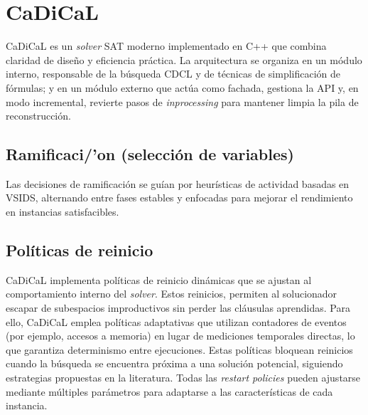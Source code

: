 \section{CaDiCaL}
\label{sec:cadical}

CaDiCaL es un \textit{solver} SAT moderno implementado en C++ que combina claridad de diseño y eficiencia práctica. La arquitectura se organiza en un módulo interno, responsable de la búsqueda CDCL y de técnicas de simplificación de fórmulas; y en un módulo externo que actúa como fachada, gestiona la API y, en modo incremental, revierte pasos de \textit{inprocessing} para mantener limpia la pila de reconstrucción.

\subsection{Ramificaci/'on (selecci\'on de variables)}
Las decisiones de ramificación se guían por heurísticas de actividad basadas en VSIDS, alternando entre fases estables y enfocadas para mejorar el rendimiento en instancias satisfacibles. %

\subsection{Políticas de reinicio}
\label{subsec:cadical-restart}

CaDiCaL implementa políticas de reinicio dinámicas que se ajustan al comportamiento interno del \textit{solver}. %
Estos reinicios, permiten al solucionador escapar de subespacios improductivos sin perder las cláusulas aprendidas. Para ello, CaDiCaL emplea políticas adaptativas que utilizan contadores de eventos (por ejemplo, accesos a memoria) en lugar de mediciones temporales directas, lo que garantiza determinismo entre ejecuciones. Estas políticas bloquean reinicios cuando la búsqueda se encuentra próxima a una solución potencial, siguiendo estrategias propuestas en la literatura. %
Todas las \textit{restart policies} pueden ajustarse mediante múltiples parámetros para adaptarse a las características de cada instancia. %

